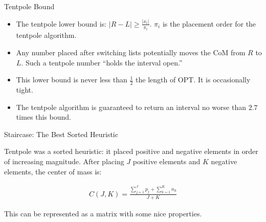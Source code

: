 \documentclass[compress,table]{beamer}
\begin{document}
\begin{frame}[t]{Tentpole Bound}

\begin{itemize}
\item The tentpole lower bound is: $|R-L|\geq \frac{|x_i|}{\pi_i}$.  $\pi_i$ is the placement order for the tentpole algorithm.  

\item Any number placed after switching lists potentially moves the CoM from  $R$ to $L$.  Such a tentpole number ``holds the interval open.''

\item This lower bound is never less than $\frac12$ the length of OPT. It is occasionally tight.

\item The tentpole algorithm is guaranteed to return an interval no worse than $2.7$ times this bound.
\end{itemize}

\end{frame}

\begin{frame}[t]{Staircase: The Best Sorted Heuristic}

Tentpole was a sorted heuristic: it placed positive and negative elements in order of increasing magnitude.  After placing {\color{red!60} $J$} positive elements and {\color{blue!60} $K$} negative elements, the center of mass is:

\begin{align*} 
C(J,K) = \frac{\sum_{j=1}^{J} p_j + \sum_{k=1}^{K} n_k }{J+K}
\end{align*}

This can be represented as a matrix with some nice properties.

\end{frame}
\end{document}
